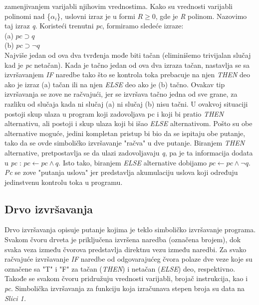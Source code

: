 \documentclass[a4paper]{article}
\begin{document}
{zamenjivanjem varijabli njihovim vrednostima. Kako su vrednosti varijabli polinomi nad \{$\alpha_i$\}, uslovni izraz je u formi $R \ge 0$, gde je \textit{R} polinom. Nazovimo taj izraz \textit{q}. Koristeći trenutni \textit{pc}, formiramo sledeće izraze: \\
(a) $pc \supset q$ \\  
(b) $pc \supset \neg q $ \\
Najviše jedan od ova dva tvrđenja mođe biti tačan (eliminišemo trivijalan slučaj kad je \textit{pc} netačan). Kada je tačno jedan od ova dva izraza tačan, nastavlja se sa izvršavanjem \textit{IF} naredbe tako što se kontrola toka prebacuje na njen \textit{THEN} deo ako je izraz (a) tačan ili na njen \textit{ELSE} deo ako je (b) tačno. Ovakav tip izvršavanja se zove ne račvajući, jer se izvršava tačno jedna od sve grane, za razliku od slučaja kada ni slučaj (a) ni slučaj (b) nisu tačni. U ovakvoj situaciji postoji skup ulaza u program koji zadovoljava pc i koji bi pratio \textit{THEN} alternativu, ali postoji i skup ulaza koji bi išao \textit{ELSE} alternativom. Pošto su obe alternative moguće, jedini kompletan pristup bi bio da se ispitaju obe putanje, tako da se ovde simboličko izvršavanje "račva" u dve putanje. Biranjem \textit{THEN} alternative, pretpostavlja se da ulazi zadovoljavaju \textit{q}, pa je ta informacija dodata u \textit{pc} : $ pc \gets pc \wedge q $. Isto tako, biranjem \textit{ELSE} alternative dobijamo 
$ pc \gets pc \wedge \neg q $. \textit{Pc} se zove "putanja uslova" jer predstavlja akumulaciju uslova koji određuju jedinstvenu kontrolu toka u programu.

\subsection{Drvo izvršavanja}
Drvo izvršavanja opisuje putanje kojima je teklo simboličko izvršavanje programa. Svakom čvoru drveta je priključena izvršena naredba (označena brojem), dok svaka veza između čvorova predstavlja direktnu vezu između naredbi. Za svako račvajuće izvršavanje \textit{IF} naredbe od odgovarajućeg čvora polaze dve veze koje su označene sa "T" i "F" za tačan (\textit{THEN}) i netačan (\textit{ELSE}) deo, respektivno. Takođe se svakom čvoru pridružuju vrednosti varijabli, brojač instrukcija, kao i \textit {pc}. Simbolička izvršavanja za funkciju koja izračunava stepen broja su data na \textit {Slici 1.}

}
\end{document}
